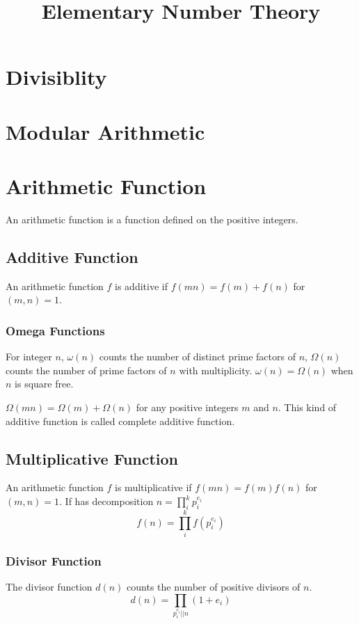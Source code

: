 \documentclass{article}
\title{Elementary Number Theory}
\begin{document}
\maketitle
\newpage
\tableofcontents
\newpage

\section{Divisiblity}

\section{Modular Arithmetic}

\section{Arithmetic Function}
An arithmetic function is a function defined on the positive integers.

\subsection{Additive Function}
An arithmetic function $f$ is additive if $f(mn) = f(m) + f(n)$ for $(m, n) = 1$.

\subsubsection*{Omega Functions}
For integer $n$, $\omega(n)$ counts the number of distinct prime factors of $n$,
$\Omega(n)$ counts the number of prime factors of $n$ with multiplicity.
$\omega(n) = \Omega(n)$ when $n$ is square free.

$\Omega(mn) = \Omega(m) + \Omega(n)$ for any positive integers $m$ and $n$.
This kind of additive function is called complete additive function.


\subsection{Multiplicative Function}
An arithmetic function $f$ is multiplicative if $f(mn) = f(m)f(n)$ for $(m, n) = 1$.
If has decomposition $n = \prod_i^k p_i^{e_i}$
$$f(n) = \prod_i^k f(p_i^{e_i})$$

\subsubsection*{Divisor Function}
The divisor function $d(n)$ counts the number of positive divisors of $n$.
$$d(n) = \prod_{p_i^{e_i} \vert\vert n} (1 + e_i)$$
\end{document}
